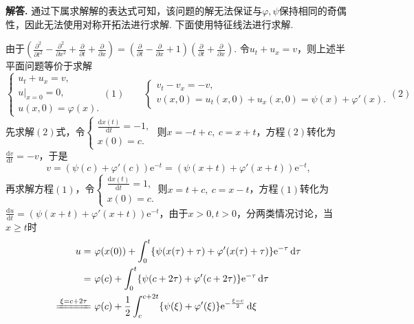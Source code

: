\documentclass[12pt, a4paper, oneside]{ctexart}
\newenvironment{solution}{\par\noindent\textbf{解答. }}{\smallskip\par}
\let\geq=\geqslant %
\def\d{\mathrm{d}}          %
\def\e{\mathrm{e}}          %
\def\add{\vspace{1ex}}      %
\begin{document}
\begin{solution}
    通过下属求解解的表达式可知，该问题的解无法保证与$\varphi,\psi$保持相同的奇偶性，因此无法使用对称开拓法进行求解. 下面使用特征线法进行求解.\add 

    由于$\left(\frac{\partial^2}{\partial t^2}-\frac{\partial^2}{\partial x^2}+\frac{\partial}{\partial t}+\frac{\partial}{\partial x}\right) = \left(\frac{\partial}{\partial t}-\frac{\partial}{\partial x}+1\right)\left(\frac{\partial}{\partial t}+\frac{\partial}{\partial x}\right)$. \add 令$u_t+u_x = v$，则上述半平面问题等价于求解
    \begin{equation*}
        \begin{cases}
            u_t+u_x=v,\\
            u|_{x=0} = 0,\\
            u(x,0) = \varphi(x).
        \end{cases}(1)\qquad\begin{cases}
            v_t-v_x = -v,\\
            v(x,0) = u_t(x,0)+u_x(x,0) = \psi(x)+\varphi'(x).
        \end{cases}(2)
    \end{equation*}
    先求解$(2)$式，令$\begin{cases}
        \frac{\d x(t)}{\d t} = -1,\\
        x(0) = c.
    \end{cases}$ 则$x = -t+c,\ c = x+t$，方程$(2)$转化为$\frac{\d v}{\d t} = -v$，于是
    \begin{equation*}
        v = (\psi(c)+\varphi'(c))\e^{-t} = (\psi(x+t)+\varphi'(x+t))\e^{-t},
    \end{equation*}
    再求解方程$(1)$，令$\begin{cases}
        \frac{\d x(t)}{\d t} = 1,\\ x(0) = c.
    \end{cases}$则$x = t+c,\ c= x-t$，方程$(1)$转化为$\frac{\d u}{\d t} = (\psi(x+t)+\varphi'(x+t))\e^{-t}$，由于$x>0,t>0$，分两类情况讨论，当$x\geq t$时
    \begin{align*}
        u =&\ \varphi(x(0)) +\int_0^t\{\psi(x(\tau)+\tau)+\varphi'(x(\tau)+\tau)\}\e^{-\tau}\,\d \tau\\
        =&\ \varphi(c)+\int_0^t\{\psi(c+2\tau)+\varphi'(c+2\tau)\}\e^{-\tau}\,\d \tau\\
        \xlongequal{\xi = c+2\tau}&\ \varphi(c)+\frac{1}{2}\int_{c}^{c+2t}\{\psi(\xi)+\varphi'(\xi)\}\e^{-\frac{\xi-c}{2}}\,\d \xi\\

\end{align*}
\end{solution}
\end{document}
